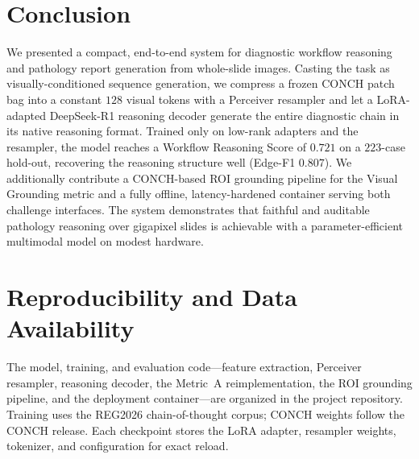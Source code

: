 \documentclass[11pt]{article}
\begin{document}
\section{Conclusion}
We presented a compact, end-to-end system for diagnostic workflow reasoning and
pathology report generation from whole-slide images. Casting the task as
visually-conditioned sequence generation, we compress a frozen CONCH patch bag
into a constant $128$ visual tokens with a Perceiver resampler and let a
LoRA-adapted DeepSeek-R1 reasoning decoder generate the entire diagnostic chain in
its native reasoning format. Trained only on low-rank adapters and the resampler,
the model reaches a Workflow Reasoning Score of $0.721$ on a $223$-case hold-out,
recovering the reasoning structure well (Edge-F1 $0.807$). We additionally
contribute a CONCH-based ROI grounding pipeline for the Visual Grounding metric and
a fully offline, latency-hardened container serving both challenge interfaces. The
system demonstrates that faithful and auditable pathology reasoning over gigapixel
slides is achievable with a parameter-efficient multimodal model on modest
hardware.

\section*{Reproducibility and Data Availability}
The model, training, and evaluation code---feature extraction, Perceiver
resampler, reasoning decoder, the Metric~A reimplementation, the ROI grounding
pipeline, and the deployment container---are organized in the project repository.
Training uses the REG2026 chain-of-thought corpus; CONCH weights follow the CONCH
release. Each checkpoint stores the LoRA adapter, resampler weights, tokenizer, and
configuration for exact reload.
\end{document}
